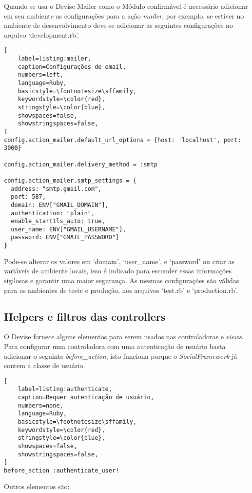 Quando se usa o Devise Mailer como o Módulo confirmável é necessário adicionar em seu ambiente as configurações para a ação \textit{mailer}, por exemplo, se estiver no ambiente de desenvolvimento deve-se adicionar as seguintes configurações no arquivo `development.rb'.

\begin{lstlisting}[
    label=listing:mailer,
    caption=Configurações de email,
    numbers=left,
    language=Ruby,
    basicstyle=\footnotesize\sffamily,
    keywordstyle=\color{red},
    stringstyle=\color{blue},
    showspaces=false,
    showstringspaces=false,
]
config.action_mailer.default_url_options = {host: 'localhost', port: 3000}

config.action_mailer.delivery_method = :smtp

config.action_mailer.smtp_settings = {
  address: "smtp.gmail.com",
  port: 587,
  domain: ENV["GMAIL_DOMAIN"],
  authentication: "plain",
  enable_starttls_auto: true,
  user_name: ENV["GMAIL_USERNAME"],
  password: ENV["GMAIL_PASSWORD"]
}
\end{lstlisting}

Pode-se alterar os valores em `domain', `user\_name', e `password' ou criar as variáveis de ambiente locais, isso é indicado para esconder essas informações sigilosas e garantir uma maior segurança. As mesmas configurações são válidas para os ambientes de teste e produção, nos arquivos `test.rb' e `production.rb'.

\subsection{Helpers e filtros das controllers}

O Devise fornece alguns elementos para serem usados nas controladoras e \textit{views}. Para configurar uma controladora com uma autenticação de usuário basta adicionar o seguinte \textit{before\_action}, isto funciona porque o \textit{SocialFramework} já contem a classe de usuário.

\begin{lstlisting}[
    label=listing:authenticate,
    caption=Requer autenticação de usuário,
    numbers=none,
    language=Ruby,
    basicstyle=\footnotesize\sffamily,
    keywordstyle=\color{red},
    stringstyle=\color{blue},
    showspaces=false,
    showstringspaces=false,
]
before_action :authenticate_user!
\end{lstlisting}

Outros elementos são:


